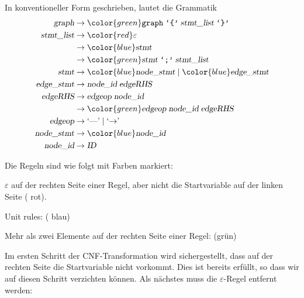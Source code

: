 
\begin{loesung}
\begin{teilaufgaben}
\item In konventioneller Form geschrieben, lautet die Grammatik
\begin{align*}
\textsl{graph}     &\rightarrow {\color{green}\texttt{graph}\; \texttt{`\{'}\; \textsl{stmt\_list}\; \texttt{`\}'}} \\
\textsl{stmt\_list}&\rightarrow {\color{red}\varepsilon}\\
                   &\rightarrow {\color{blue}\textsl{stmt}}\\
                   &\rightarrow {\color{green}\textsl{stmt}\; \texttt{`;'}\; \textsl{stmt\_list}}\\
\textsl{stmt}      &\rightarrow {\color{blue}\textsl{node\_stmt}}\; |\;
                                {\color{blue}\textsl{edge\_stmt}} \\
\textsl{edge\_stmt}&\rightarrow \textsl{node\_id}\; \textsl{edgeRHS} \\
\textsl{edgeRHS}   &\rightarrow \textsl{edgeop}\; \textsl{node\_id}\\
                   &\rightarrow {\color{green}\textsl{edgeop}\; \textsl{node\_id}\; \textsl{edgeRHS}}\\
\textsl{edgeop}    &\rightarrow \textrm{`\text{---}'}\; |\; \textrm{`$\rightarrow$'}\; \\
\textsl{node\_stmt}&\rightarrow {\color{blue}\textsl{node\_id}} \\
\textsl{node\_id}  &\rightarrow {\textsl{ID}}
\end{align*}
\item Die Regeln sind wie folgt mit Farben markiert:
\begin{compactenum}
\item $\varepsilon$ auf der rechten Seite einer Regel, aber nicht die
Startvariable auf der linken Seite ({\color{red} rot}).
\item Unit rules: ({\color{blue} blau})
\item Mehr als zwei Elemente auf der rechten Seite einer Regel:
({\color{green}grün})
\end{compactenum}
\item Im ersten Schritt der CNF-Transformation wird sichergestellt, dass
auf der rechten Seite die Startvariable nicht vorkommt.
Dies ist bereits erfüllt, so dass wir auf diesen Schritt verzichten können.
Als nächstes muss die $\varepsilon$-Regel entfernt werden:

\end{teilaufgaben}
\end{loesung}

